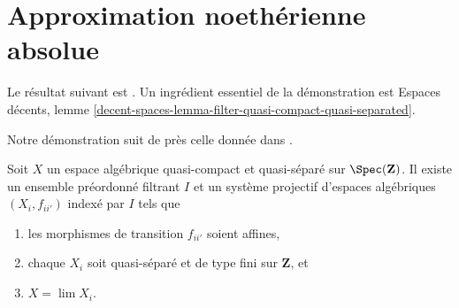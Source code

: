 \section{Approximation noethérienne absolue}
\label{section-approximation}

\noindent
Le résultat suivant est \cite[théorème 1.2.2]{CLO}.
Un ingrédient essentiel de la démonstration est
Espaces décents, lemme
\ref{decent-spaces-lemma-filter-quasi-compact-quasi-separated}.

\begin{proposition}
\label{proposition-approximate}
\begin{reference}
Notre démonstration suit de près celle donnée dans \cite[théorème 1.2.2]{CLO}.
\end{reference}
Soit $X$ un espace algébrique quasi-compact et quasi-séparé sur
$\Spec(\mathbf{Z})$. Il existe un ensemble préordonné filtrant $I$
et un système projectif d'espaces algébriques $(X_i, f_{ii'})$ indexé par $I$
tels que
\begin{enumerate}
\item les morphismes de transition $f_{ii'}$ soient affines,
\item chaque $X_i$ soit quasi-séparé et de type fini sur
$\mathbf{Z}$, et
\item $X = \lim X_i$.
\end{enumerate}
\end{proposition}

